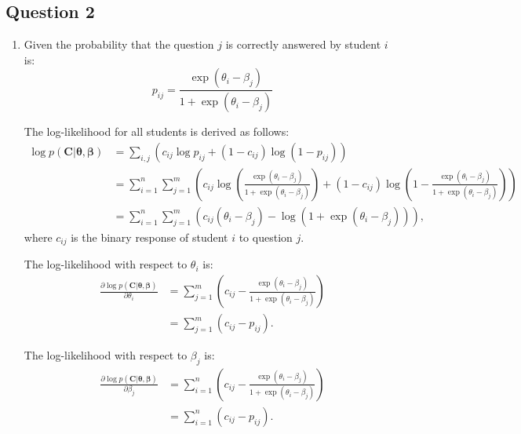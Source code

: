 \documentclass{article}
\begin{document}
\newpage

\subsection*{Question 2}

\begin{enumerate}[label=(\alph*)]
    \item Given the probability that the question $j$ is correctly answered by student $i$ is:
    \begin{equation*}
        p_{ij} =  \frac{\exp(\theta_i - \beta_j)}{1 + \exp(\theta_i - \beta_j)}
    \end{equation*}
    
    The log-likelihood for all students is derived as follows:
    \begin{align*}
        \log p(\mathbf{C}|\boldsymbol{\theta}, \boldsymbol{\beta}) &= \sum_{i, j} (c_{ij} \log p_{ij} + (1 - c_{ij}) \log (1 - p_{ij})) \\
        &= \sum_{i=1}^{n} \sum_{j=1}^{m} \left( c_{ij} \log \left( \frac{\exp(\theta_i - \beta_j)}{1 + \exp(\theta_i - \beta_j)} \right) + (1 - c_{ij}) \log \left( 1 - \frac{\exp(\theta_i - \beta_j)}{1 + \exp(\theta_i - \beta_j)} \right) \right) \\
        &= \sum_{i=1}^{n} \sum_{j=1}^{m} (c_{ij} (\theta_i - \beta_j) - \log(1 + \exp(\theta_i - \beta_j))),
    \end{align*}
    where $c_{ij}$ is the binary response of student $i$ to question $j$.

    The log-likelihood with respect to $\theta_i$ is:
    \begin{align*}
        \frac{\partial \log p(\mathbf{C}|\boldsymbol{\theta}, \boldsymbol{\beta})}{\partial \theta_i} &= \sum_{j=1}^{m} \left( c_{ij} - \frac{\exp(\theta_i - \beta_j)}{1 + \exp(\theta_i - \beta_j)} \right) \\
        &= \sum_{j=1}^{m} (c_{ij} - p_{ij}).
    \end{align*}

    The log-likelihood with respect to $\beta_j$ is:
    \begin{align*}
        \frac{\partial \log p(\mathbf{C}|\boldsymbol{\theta}, \boldsymbol{\beta})}{\partial \beta_j} &= \sum_{i=1}^{n} \left( c_{ij} - \frac{\exp(\theta_i - \beta_j)}{1 + \exp(\theta_i - \beta_j)} \right) \\
        &= \sum_{i=1}^{n} (c_{ij} - p_{ij}).
    \end{align*}


\end{enumerate}
\end{document}
